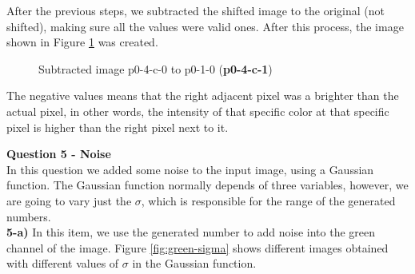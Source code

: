 \documentclass[12pt,a4paper]{article}
\begin{document}
After the previous steps, we subtracted the shifted image to the original (not shifted), making sure all the values were valid ones. After this process, the image shown in Figure \ref{fig:p0-4-c-1} was created.

\begin{figure}[!h]
	\centering
	{%
		\setlength{\fboxsep}{1pt}%
		\setlength{\fboxrule}{1pt}%
	}%
	\caption{Subtracted image p0-4-c-0 to p0-1-0 (\textbf{p0-4-c-1})}
	\label{fig:p0-4-c-1}
\end{figure}


The negative values means that the right adjacent pixel was a brighter than the actual pixel, in other words, the intensity of that specific color at that specific pixel is higher than the right pixel next to it.

\newpage

\textbf{Question 5 - Noise} \\

In this question we added some noise to the input image, using a Gaussian function. The Gaussian function normally depends of three variables, however, we are going to vary just the $\sigma$, which is responsible for the range of the generated numbers. \\

\textbf{5-a) }  In this item, we use the generated number to add noise into the green channel of the image. Figure \ref{fig:green-sigma} shows different images obtained with different values of $\sigma$ in the Gaussian function. \\
\end{document}

